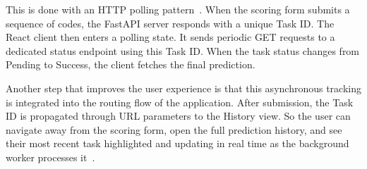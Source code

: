 This is done with an HTTP polling pattern~\cite{aws_async_api_2021}. When the scoring form submits a sequence of codes, the FastAPI server responds with a unique Task ID. The React client then enters a polling state. It sends periodic GET requests to a dedicated status endpoint using this Task ID. When the task status changes from Pending to Success, the client fetches the final prediction.

Another step that improves the user experience is that this asynchronous tracking is integrated into the routing flow of the application. After submission, the Task ID is propagated through URL parameters to the History view. So the user can navigate away from the scoring form, open the full prediction history, and see their most recent task highlighted and updating in real time as the background worker processes it~\cite{aws_async_api_2021}.